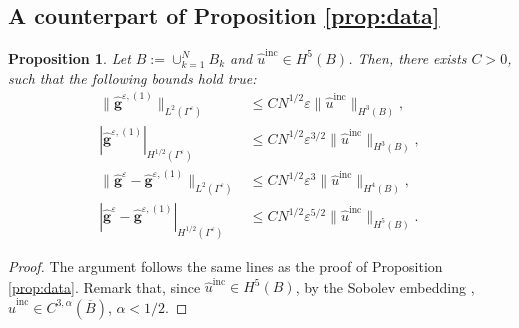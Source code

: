 \documentclass[]{article}
\newtheorem{proposition}{Proposition}
\numberwithin{equation}{section}
\numberwithin{theorem}{section}
\numberwithin{lemma}{section}
\numberwithin{corollary}{section}
\numberwithin{proposition}{section}
\numberwithin{definition}{section}
\newcommand{\re}{\varepsilon}
\newcommand{\inc}{\operatorname{inc}}
\begin{document}
\begin{appendices}
		\section{A counterpart of Proposition \ref{prop:data}}
		\begin{proposition}
			\label{prop:td2}
			Let $B:= \cup_{k=1}^N B_k$ and $\hat{u}^{\operatorname{inc}} \in H^5(B)$. Then, there exists $C > 0$, such that the following bounds hold true:
			\begin{align*}%
				\|\hat{\boldsymbol{g}}^{\re,(1)}\|_{L^2(\Gamma^{\re})}&\leq CN^{1/2}\re\|\hat{u}^{\inc}\|_{H^3(B)}, \\
				| \hat{\boldsymbol{g}}^{\re,(1)}|_{H^{1/2}(\Gamma^{\re})}&\leq CN^{1/2}\re^{3/2}\|\hat{u}^{\inc}\|_{H^3(B)},\\
				\| \hat{\boldsymbol{g}}^{\re}-\hat {\boldsymbol{g}}^{\re,(1)}\|_{L^2(\Gamma^{\re})}&\leq CN^{1/2}\varepsilon^3 \|\hat{ u}^{\operatorname{inc}}\|_{H^4(B)}, \\
				| \hat{\boldsymbol{g}}^{\re}-\hat {\boldsymbol{g}}^{\re,(1)}|_{H^{1/2}(\Gamma^{\re})}&\leq CN^{1/2}\varepsilon^{5/2}\|\hat{ u}^{\operatorname{inc}}\|_{H^5(B)}. 
			\end{align*}
		\end{proposition}
		\begin{proof}
			The argument follows the same lines as the proof of Proposition \ref{prop:data}. Remark that, since $\hat{u}^{\inc} \in H^5(B)$, by the Sobolev embedding \cite[Theorem 4.12, part 2]{adams}, $\hat{u}^{\inc}\in C^{3,\alpha}(\overline{B})$, $\alpha<1/2$. 
			

\end{proof}
\end{appendices}
\end{document}
